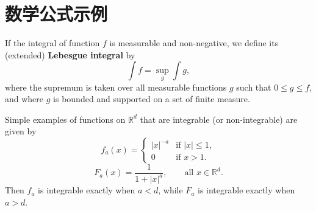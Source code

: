 \section{数学公式示例}
If the integral of function $f$ is measurable and non-negative, we define
its (extended) \textbf{Lebesgue integral} by
\begin{equation}
    \int f = \sup_g \int g,
\end{equation}
where the supremum is taken over all measurable functions $g$ such that
$0 \leq g \leq f$, and where $g$ is bounded and supported on a set of
finite measure.


Simple examples of functions on $\mathbb{R}^d$ that are integrable
(or non-integrable) are given by
\begin{equation}
f_a(x) =
\begin{cases}
|x|^{-a} & \text{if } |x| \leq 1,\\
0 & \text{if } x > 1.
\end{cases}
\end{equation}
\begin{equation}
F_a(x) = \frac{1}{1 + |x|^a}, \qquad \text{all } x \in \mathbb{R}^d.
\end{equation}
Then $f_a$ is integrable exactly when $a < d$, while $F_a$ is integrable
exactly when $a > d$.
